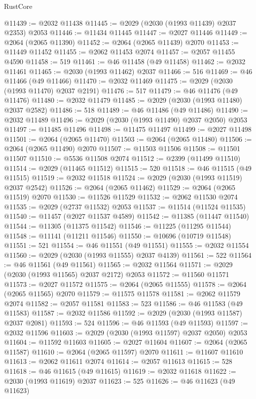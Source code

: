 \begin{lexlean}{RustCore}
\begin{coremodule}
@11439 := @2032 @11438
@11445 := @2029 (@2030 (@1993 @11439) @2037 @2353) @2053
@11446 := @11434 @11445
@11447 := @2027 @11446
@11449 := @2064 (@2065 @11390)
@11452 := @2064 (@2065 @11439) @2070
@11453 := @11449 @11452
@11455 := @2062 @11453 @2074
@11457 := @2057 @11455 @4590
@11458 := 519
@11461 := @46 @11458 (@49 @11458)
@11462 := @2032 @11461
@11465 := @2030 (@1993 @11462) @2037
@11466 := 516
@11469 := @46 @11466 (@49 @11466)
@11470 := @2032 @11469
@11475 := @2029 (@2030 (@1993 @11470) @2037 @2191)
@11476 := 517
@11479 := @46 @11476 (@49 @11476)
@11480 := @2032 @11479
@11485 := @2029 (@2030 (@1993 @11480) @2037 @2582)
@11486 := 518
@11489 := @46 @11486 (@49 @11486)
@11490 := @2032 @11489
@11496 := @2029 (@2030 (@1993 @11490) @2037 @2050) @2053
@11497 := @11485 @11496
@11498 := @11475 @11497
@11499 := @2027 @11498
@11501 := @2064 (@2065 @11470)
@11503 := @2064 (@2065 @11480)
@11506 := @2064 (@2065 @11490) @2070
@11507 := @11503 @11506
@11508 := @11501 @11507
@11510 := @5536 @11508 @2074
@11512 := @2399 (@11499 @11510)
@11514 := @2029 (@11465 @11512)
@11515 := 520
@11518 := @46 @11515 (@49 @11515)
@11519 := @2032 @11518
@11524 := @2029 (@2030 (@1993 @11519) @2037 @2542)
@11526 := @2064 (@2065 @11462)
@11529 := @2064 (@2065 @11519) @2070
@11530 := @11526 @11529
@11532 := @2062 @11530 @2074
@11535 := @2029 (@2737 @11532) @2053
@11537 := @11514 (@11524 @11535)
@11540 := @11457 (@2027 @11537 @4589)
@11542 := @11385 (@11447 @11540)
@11544 := @11305 (@11375 @11542)
@11546 := @11225 (@11295 @11544)
@11548 := @11141 (@11211 @11546)
@11550 := @10696 (@10719 @11548)
@11551 := 521
@11554 := @46 @11551 (@49 @11551)
@11555 := @2032 @11554
@11560 := @2029 (@2030 (@1993 @11555) @2037 @4139)
@11561 := 522
@11564 := @46 @11561 (@49 @11561)
@11565 := @2032 @11564
@11571 := @2029 (@2030 (@1993 @11565) @2037 @2172) @2053
@11572 := @11560 @11571
@11573 := @2027 @11572
@11575 := @2064 (@2065 @11555)
@11578 := @2064 (@2065 @11565) @2070
@11579 := @11575 @11578
@11581 := @2062 @11579 @2074
@11582 := @2057 @11581
@11583 := 523
@11586 := @46 @11583 (@49 @11583)
@11587 := @2032 @11586
@11592 := @2029 (@2030 (@1993 @11587) @2037 @2081)
@11593 := 524
@11596 := @46 @11593 (@49 @11593)
@11597 := @2032 @11596
@11603 := @2029 (@2030 (@1993 @11597) @2037 @2050) @2053
@11604 := @11592 @11603
@11605 := @2027 @11604
@11607 := @2064 (@2065 @11587)
@11610 := @2064 (@2065 @11597) @2070
@11611 := @11607 @11610
@11613 := @2062 @11611 @2074
@11614 := @2057 @11613
@11615 := 528
@11618 := @46 @11615 (@49 @11615)
@11619 := @2032 @11618
@11622 := @2030 (@1993 @11619) @2037
@11623 := 525
@11626 := @46 @11623 (@49 @11623)

\end{coremodule}
\end{lexlean}

